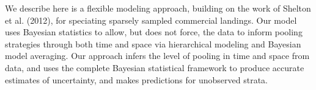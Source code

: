 \documentclass[12pt]{article}
\begin{document}
%
%
%



We describe here is a flexible modeling approach, building on the work of 
Shelton et al. (2012), for speciating sparsely sampled commercial landings. Our 
model uses Bayesian statistics to allow, but does not force, the data to 
inform pooling strategies through both time and space via hierarchical 
modeling and Bayesian model averaging. Our approach infers the level of 
pooling in time and space from data, and uses the complete Bayesian statistical 
framework to produce accurate estimates of uncertainty, and makes predictions 
for unobserved strata. 
\end{document}
